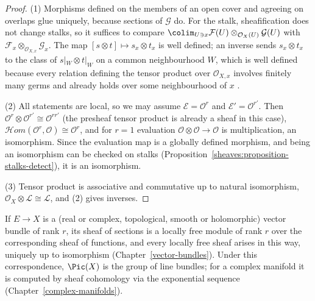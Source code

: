 \begin{proof}
(1) Morphisms defined on the members of an open cover and agreeing on overlaps glue uniquely, because sections of $\mathcal{G}$ do. For the stalk, sheafification does not change stalks,
so it suffices to compare $\colim_{U \ni x}\mathcal{F}(U) \otimes_{\mathcal{O}_X(U)} \mathcal{G}(U)$ with $\mathcal{F}_x \otimes_{\mathcal{O}_{X,x}} \mathcal{G}_x$. The map
$[s \otimes t] \mapsto s_x \otimes t_x$ is well defined; an inverse sends $s_x \otimes t_x$ to the class of $s|_W \otimes t|_W$ on a common neighbourhood $W$, which is well defined because
every relation defining the tensor product over $\mathcal{O}_{X,x}$ involves finitely many germs and already holds over some neighbourhood of $x$ \cite[Chapter II, Section 5]{hartshorne-ag}.

(2) All statements are local, so we may assume $\mathcal{E} = \mathcal{O}^r$ and $\mathcal{E}' = \mathcal{O}^{r'}$. Then $\mathcal{O}^r \otimes \mathcal{O}^{r'} \cong \mathcal{O}^{rr'}$ (the
presheaf tensor product is already a sheaf in this case), $\mathcal{H}om(\mathcal{O}^r, \mathcal{O}) \cong \mathcal{O}^r$, and for $r = 1$ evaluation $\mathcal{O} \otimes \mathcal{O} \to \mathcal{O}$
is multiplication, an isomorphism. Since the evaluation map is a globally defined morphism, and being an isomorphism can be checked on stalks
(Proposition~\ref{sheaves:proposition-stalks-detect}), it is an isomorphism.

(3) Tensor product is associative and commutative up to natural isomorphism, $\mathcal{O}_X \otimes \mathcal{L} \cong \mathcal{L}$, and (2) gives inverses.
\end{proof}

\begin{remark}\label{sheaves:remark-vector-bundles}
If $E \to X$ is a (real or complex, topological, smooth or holomorphic) vector bundle of rank $r$, its sheaf of sections is a locally free module of rank $r$ over the corresponding
sheaf of functions, and every locally free sheaf arises in this way, uniquely up to isomorphism (Chapter~\ref{vector-bundles}). Under this correspondence, $\Pic(X)$ is the group of line
bundles; for a complex manifold it is computed by sheaf cohomology via the exponential sequence (Chapter~\ref{complex-manifolds}).
\end{remark}

